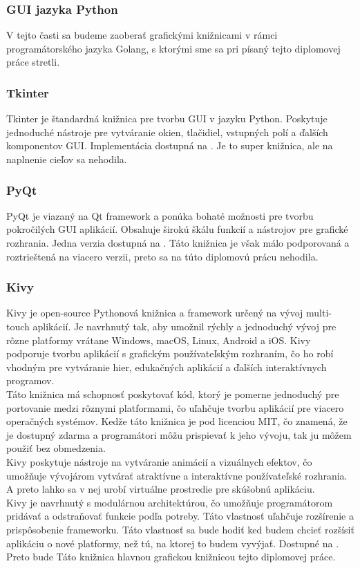 \subsubsection{GUI jazyka Python}
\tab[5 mm] V tejto časti sa budeme zaoberať grafickými knižnicami v rámci programátorského jazyka Golang, s ktorými sme sa pri písaný tejto diplomovej práce stretli.

\subsubsection{ Tkinter}
\tab[5 mm] Tkinter je štandardná knižnica pre tvorbu GUI v jazyku Python. Poskytuje jednoduché nástroje pre vytváranie okien, tlačidiel, vstupných polí a ďalších komponentov GUI. Implementácia dostupná na \cite{PYthon6}. Je to super knižnica, ale na naplnenie cieľov sa nehodila.
\subsubsection{PyQt}
\tab[5 mm] PyQt je viazaný na Qt framework a ponúka bohaté možnosti pre tvorbu pokročilých GUI aplikácií. Obsahuje širokú škálu funkcií a nástrojov pre grafické rozhrania. Jedna verzia dostupná na \cite{PYthon7}. Táto knižnica je však málo podporovaná a roztrieštená na viacero verzii, preto sa na túto diplomovú prácu nehodila. 
\subsubsection{Kivy}
\tab[5 mm] Kivy je open-source Pythonová knižnica a framework určený na vývoj multi-touch aplikácií. Je navrhnutý tak, aby umožnil rýchly a jednoduchý vývoj pre rôzne platformy vrátane Windows, macOS, Linux, Android a iOS. Kivy podporuje tvorbu aplikácií s grafickým používateľským rozhraním, čo ho robí vhodným pre vytváranie hier, edukačných aplikácií a ďalších interaktívnych programov. \\
\tab[5 mm] Táto knižnica má schopnosť poskytovať kód, ktorý je pomerne jednoduchý pre portovanie medzi rôznymi platformami, čo uľahčuje tvorbu aplikácií pre viacero operačných systémov. Kedže táto knižnica je pod licenciou MIT, čo znamená, že je dostupný zdarma a programátori môžu prispievať k jeho vývoju, tak ju môžem použiť bez obmedzenia. \\
\tab[5 mm] Kivy poskytuje nástroje na vytváranie animácií a vizuálnych efektov, čo umožňuje vývojárom vytvárať atraktívne a interaktívne používateľské rozhrania. A preto lahko sa v nej urobí virtuálne prostredie pre skúšobnú aplikáciu.\\
\tab[5 mm] Kivy je navrhnutý s modulárnou architektúrou, čo umožňuje programátorom pridávať a odstraňovať funkcie podľa potreby. Táto vlastnosť uľahčuje rozšírenie a prispôsobenie frameworku. Táto vlastnosť sa bude hodiť ked budem chcieť rozšísiť aplikáciu o nové platformy, než tú, na ktorej to budem vyvýjať. Dostupné na \cite{PYthon9}. Preto bude Táto knižnica hlavnou grafickou knižnicou tejto diplomovej práce.

